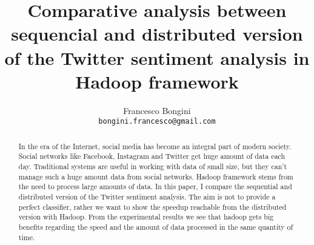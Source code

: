 \documentclass[10pt,twocolumn,letterpaper]{article}
\begin{document}
\title{Comparative analysis between sequencial and distributed version of the Twitter sentiment analysis in Hadoop framework}

\author{Francesco Bongini\\
\tt\small bongini.francesco@gmail.com}

\maketitle
\thispagestyle{empty}

\begin{abstract}

In the era of the Internet, social media has become an integral part of modern society. Social networks like Facebook, Instagram and Twitter get huge amount of data each day. Traditional systems are useful in working with data of small size, but they can’t manage such a huge amount data from social networks.
Hadoop framework stems from the need to process large amounts of data.
In this paper, I compare the sequential and distributed version of the Twitter sentiment analysis. The aim is not to provide a perfect classifier, rather we want to show the speedup reachable from the distributed version with Hadoop. From the experimental results we see that hadoop gets big benefits regarding the speed and the
amount of data processed in the same quantity of time.

 
\end{abstract}
\end{document}
